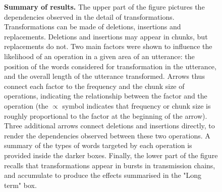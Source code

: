 \begin{figure}[p]
  \caption[Summary of results]{
  \textbf{Summary of results.}
  The upper part of the figure pictures the dependencies observed in the detail of transformations.
  Transformations can be made of deletions, insertions and replacements.
  Deletions and insertions may appear in chunks, but replacements do not.
  Two main factors were shown to influence the likelihood of an operation in a given area of an utterance:
  the position of the words considered for transformation in the utterance, and the overall length of the utterance transformed.
  Arrows thus connect each factor to the frequency and the chunk size of operations, indicating the relationship between the factor and the operation (the $\propto$ symbol indicates that frequency or chunk size is roughly proportional to the factor at the beginning of the arrow).
  Three additional arrows connect deletions and insertions directly, to render the dependencies observed between these two operations.
  A summary of the types of words targeted by each operation is provided inside the darker boxes.
  Finally, the lower part of the figure recalls that transformations appear in bursts in transmission chains, and accumulate to produce the effects summarised in the "Long term" box.
  }
  \label{fig:gistr-summary}
\end{figure}
